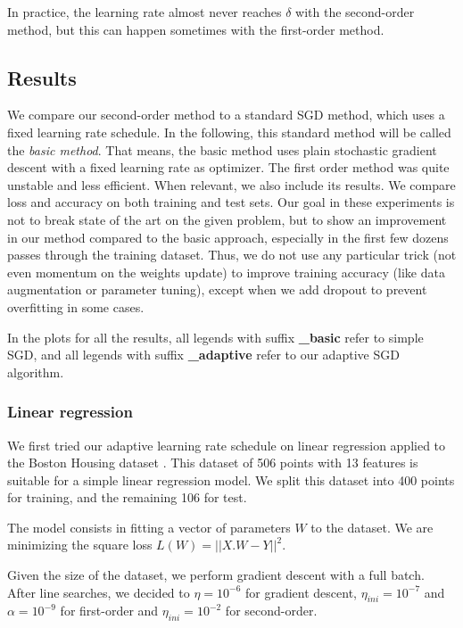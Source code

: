 \documentclass{article}
\begin{document}
  In practice, the learning rate almost never reaches $\delta$ with the second-order method, but this can happen sometimes with the first-order method. 
  
  \subsection{Results} 
  
  We compare our second-order method to a standard SGD method, which uses a fixed learning rate schedule. In the following, this standard method will be called the \emph{basic method}. That means, the basic method uses plain stochastic gradient descent with a fixed learning rate as optimizer. The first order method was quite unstable and less efficient. When relevant, we also include its results. We compare loss and accuracy on both training and test sets. Our goal in these experiments is not to break state of the art on the given problem, but to show an improvement in our method compared to the basic approach, especially in the first few dozens passes through the training dataset. Thus, we do not use any particular trick (not even momentum on the weights update) to improve training accuracy (like data augmentation or parameter tuning), except when we add dropout to prevent overfitting in some cases.
  
  In the plots for all the results, all legends with suffix \textbf{\_basic} refer to simple SGD, and all legends with suffix \textbf{\_adaptive} refer to our adaptive SGD algorithm.
  
  \subsubsection{Linear regression}
  
  We first tried our adaptive learning rate schedule on linear regression applied to the Boston Housing dataset \cite{boston}. This dataset of 506 points with 13 features is suitable for a simple linear regression model. We split this dataset into 400 points for training, and the remaining 106 for test.
  
  The model consists in fitting a vector of parameters $W$ to the dataset. We are minimizing the square loss $L(W)=||X.W-Y||^{2}$.
  
  Given the size of the dataset, we perform gradient descent with a full batch. After line searches, we decided to $\eta=10^{-6}$ for gradient descent, $\eta_{ini} = 10^{-7}$ and $\alpha = 10^{-9}$ for first-order and $\eta_{ini}=10^{-2}$ for second-order.
\end{document}

